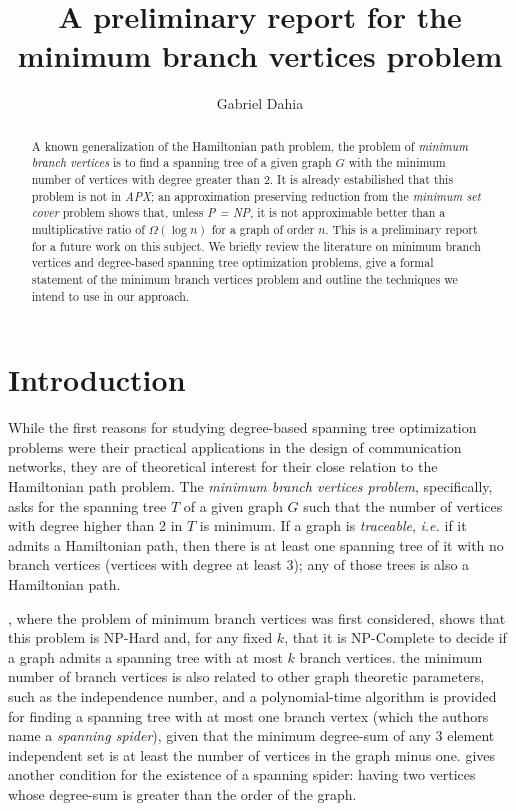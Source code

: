 \documentclass[12pt]{article}
\title{A preliminary report for the minimum branch vertices problem}
\author{Gabriel Dahia\inst{1}}
\begin{document}
 

\maketitle

\begin{abstract}
  A known generalization of the Hamiltonian path problem, the problem of \emph{minimum branch vertices} is to find a spanning tree of a given graph $G$ with the minimum number of vertices with degree greater than 2.
  It is already estabilished that this problem is not in \emph{APX}; an approximation preserving reduction from the \emph{minimum set cover} problem shows that, unless \emph{P = NP}, it is not approximable better than a multiplicative ratio of $\Omega(\log n )$ for a graph of order $n$.
  This is a preliminary report for a future work on this subject.
  We briefly review the literature on minimum branch vertices and degree-based spanning tree optimization problems, give a formal statement of the minimum branch vertices problem and outline the techniques we intend to use in our approach.
\end{abstract}
     
\section{Introduction}

While the first reasons for studying degree-based spanning tree optimization problems were their practical applications in the design of communication networks, they are of theoretical interest for their close relation to the Hamiltonian path problem.
The \emph{minimum branch vertices problem}, specifically, asks for the spanning tree $T$ of a given graph $G$ such that the number of vertices with degree higher than 2 in $T$ is minimum.
If a graph is \emph{traceable}, \emph{i.e.} if it admits a Hamiltonian path, then there is at least one spanning tree of it with no branch vertices (vertices with degree at least 3); any of those trees is also a Hamiltonian path.

\cite{gargano2004}, where the problem of minimum branch vertices was first considered, shows that this problem is NP-Hard and, for any fixed $k$, that it is NP-Complete to decide if a graph admits a spanning tree with at most $k$ branch vertices. 
the minimum number of branch vertices is also related to other graph theoretic parameters, such as the independence number, and a polynomial-time algorithm is provided for finding a spanning tree with at most one branch vertex (which the authors name a \emph{spanning spider}), given that the minimum degree-sum of any 3 element independent set is at least the number of vertices in the graph minus one.
\cite{flandrin2008} gives another condition for the existence of a spanning spider: having two vertices whose degree-sum is greater than the order of the graph.
\end{document}
